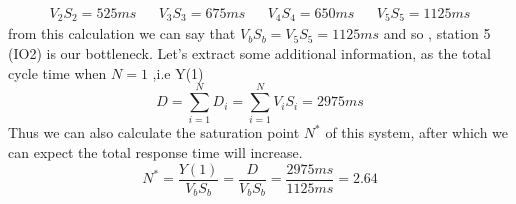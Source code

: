\documentclass[12pt,a4paper]{article}
\begin{document}
    \begin{displaymath}
        \begin{aligned}
            V_2S_2= 525ms && V_3S_3=675ms && V_4S_4=650ms && V_5S_5= 1125ms
        \end{aligned}
    \end{displaymath}
    from this calculation we can say that $V_bS_b=V_5S_5=1125ms$ and so , station 5 (IO2) is 
    our bottleneck. Let's extract some additional information, as the total cycle time when $N=1$ ,i.e Y(1) 
    \begin{displaymath}
        D=\sum_{i=1}^{N}D_i=\sum_{i=1}^{N}V_iS_i=2975ms
    \end{displaymath}
    Thus we can also calculate the saturation point $N^*$ of this system, after which we can expect
    the total response time will increase. 
    \begin{displaymath}
        N^*=\frac{Y(1)}{V_bS_b}=\frac{D}{V_bS_b}=\frac{2975ms}{1125ms}=2.64
    \end{displaymath}

    
\end{document}
